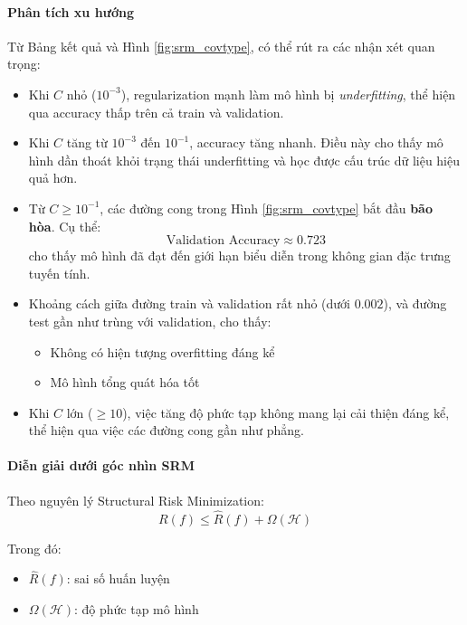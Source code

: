 \paragraph{Phân tích xu hướng}

Từ Bảng kết quả và Hình \ref{fig:srm_covtype}, có thể rút ra các nhận xét quan trọng:

\begin{itemize}
    \item Khi $C$ nhỏ ($10^{-3}$), regularization mạnh làm mô hình bị \textit{underfitting}, thể hiện qua accuracy thấp trên cả train và validation.

    \item Khi $C$ tăng từ $10^{-3}$ đến $10^{-1}$, accuracy tăng nhanh. Điều này cho thấy mô hình dần thoát khỏi trạng thái underfitting và học được cấu trúc dữ liệu hiệu quả hơn.

    \item Từ $C \ge 10^{-1}$, các đường cong trong Hình \ref{fig:srm_covtype} bắt đầu \textbf{bão hòa}. Cụ thể:
    \[
    \text{Validation Accuracy} \approx 0.723
    \]
    cho thấy mô hình đã đạt đến giới hạn biểu diễn trong không gian đặc trưng tuyến tính.

    \item Khoảng cách giữa đường train và validation rất nhỏ (dưới $0.002$), và đường test gần như trùng với validation, cho thấy:
    \begin{itemize}
        \item Không có hiện tượng overfitting đáng kể
        \item Mô hình tổng quát hóa tốt
    \end{itemize}

    \item Khi $C$ lớn ($\ge 10$), việc tăng độ phức tạp không mang lại cải thiện đáng kể, thể hiện qua việc các đường cong gần như phẳng.
\end{itemize}

\paragraph{Diễn giải dưới góc nhìn SRM}

Theo nguyên lý Structural Risk Minimization:
\[
R(f) \le \hat{R}(f) + \Omega(\mathcal{H})
\]

Trong đó:
\begin{itemize}
    \item $\hat{R}(f)$: sai số huấn luyện
    \item $\Omega(\mathcal{H})$: độ phức tạp mô hình
\end{itemize}

